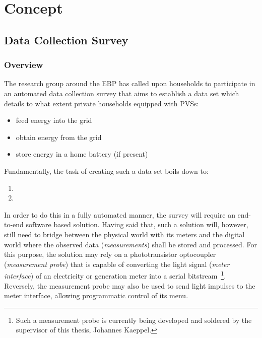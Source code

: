 
\chapter{Concept}
\label{chp:concept}

\section{Data Collection Survey}
\label{sec:data-collection-survey}

\subsection{Overview}
\label{sec:survey-overview}

The research group around the \ac{EBP} has called upon households to participate in an automated data collection survey that aims to establish a data set which details to what extent private households equipped with \acsp{PVS}:

\begin{itemize}
  \item feed energy into the grid
  \item obtain energy from the grid
  \item store energy in a home battery (if present)
\end{itemize}

Fundamentally, the task of creating such a data set boils down to:


\begin{enumerate}[label=(\Alph*)]
  \item {}
  \item {}
\end{enumerate}

In order to do this in a fully automated manner, the survey will require an end-to-end software based solution. Having said that, such a solution will, however, still need to bridge between the physical world with its meters and the digital world where the observed data (\textit{measurements}) shall be stored and processed. For this purpose, the solution may rely on a phototransistor optocoupler (\textit{measurement probe}) that is capable of converting the light signal (\textit{meter interface}) of an electricity or generation meter into a serial bitstream~\footnote{Such a measurement probe is currently being developed and soldered by the supervisor of this thesis, Johannes Kaeppel.}. Reversely, the measurement probe may also be used to send light impulses to the meter interface, allowing programmatic control of its menu.


